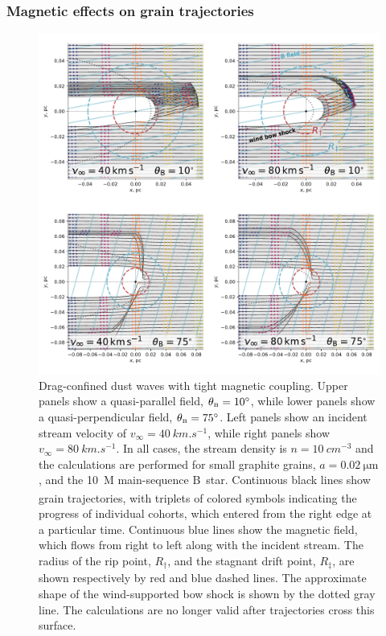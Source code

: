 \subsubsection{Magnetic effects on grain trajectories }
\label{sec:magn-effects-grain}

\begin{figure}
  \centering
  \includegraphics[width=\linewidth]{figs/frozen-stream-map-multi}
  \caption{Drag-confined dust waves with tight magnetic coupling.
    Upper panels show a quasi-parallel field, \(\theta_{\scriptscriptstyle\text{B}} = \ang{10}\),
    while lower panels show a quasi-perpendicular field,
    \(\theta_{\scriptscriptstyle\text{B}} = \ang{75}\).  Left panels show an incident stream velocity of
    \(v_\infty = \SI{40}{km.s^{-1}}\), while right panels show
    \(v_\infty = \SI{80}{km.s^{-1}}\).  In all cases, the stream density is
    \(n = \SI{10}{cm^{-3}}\) and the calculations are performed for
    small graphite grains, \(a = \SI{0.02}{\um}\), and the
    \SI{10}{M_\odot} main-sequence B~star.  Continuous black lines show
    grain trajectories, with triplets of colored symbols indicating
    the progress of individual cohorts, which entered from the right
    edge at a particular time.  Continuous blue lines show the
    magnetic field, which flows from right to left along with the
    incident stream.  The radius of the rip point, \(R_\dag\), and the
    stagnant drift point, \(R_\ddag\), are shown respectively by red and
    blue dashed lines.  The approximate shape of the wind-supported
    bow shock is shown by the dotted gray line.  The calculations are
    no longer valid after trajectories cross this surface.}
  \label{fig:frozen-stream}
\end{figure}

